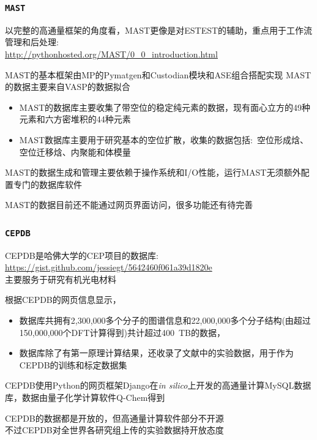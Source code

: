 \frame
{
\frametitle{\tt{MAST}}
以完整的高通量框架的角度看，\textrm{MAST}更像是对\textrm{ESTEST}的辅助，重点用于工作流管理和后处理:\\
\url{http://pythonhosted.org/MAST/0_0_introduction.html}

\textrm{MAST}的基本框架由\textrm{MP}的\textrm{Pymatgen}和\textrm{Custodian}模块和\textrm{ASE}组合搭配实现
\vskip 2pt
{\fontsize{6.5pt}{4.2pt}}
\vskip 2pt
\textrm{MAST}的数据主要来自\textrm{VASP}的数据拟合\\

\begin{itemize}
	\item \textrm{MAST}的数据库主要收集了带空位的稳定纯元素的数据，现有面心立方的\textrm{49}种元素和六方密堆积的\textrm{44}种元素
	\item \textrm{MAST}数据库主要用于研究基本的空位扩散，收集的数据包括:~空位形成焓、空位迁移焓、内聚能和体模量
\end{itemize}
\textrm{MAST}的数据生成和管理主要依赖于操作系统和\textrm{I/O}性能，运行\textrm{MAST}无须额外配置专门的数据库软件

\textrm{MAST}的数据目前还不能通过网页界面访问，很多功能还有待完善

}

\frame
{
\frametitle{\tt{CEPDB}}
\textrm{CEPDB}是哈佛大学的\textrm{CEP}项目的数据库:\\%
\url{https://gist.github.com/jessiegt/5642460f061a39d1820e}\\
主要服务于研究有机光电材料

根据\textrm{CEPDB}的网页信息显示，
\begin{itemize}
	\item 数据库共拥有\textrm{2,300,000}多个分子的图谱信息和\textrm{22,000,000}多个分子结构(由超过\textrm{150,000,000}个\textrm{DFT}计算得到)共计超过\textrm{400~TB}的数据，
	\item 数据库除了有第一原理计算结果，还收录了文献中的实验数据，用于作为\textrm{CEPDB}的训练和标定数据集
\end{itemize}
\textrm{CEPDB}使用\textrm{Python}的网页框架\textrm{Django}在\textit{in silico}上开发的高通量计算\textrm{MySQL}数据库，数据由量子化学计算软件\textrm{Q-Chem}得到\\
{\fontsize{6.5pt}{4.2pt}}

\textrm{CEPDB}的数据都是开放的，但高通量计算软件部分不开源\\不过\textrm{CEPDB}对全世界各研究组上传的实验数据持开放态度
}

